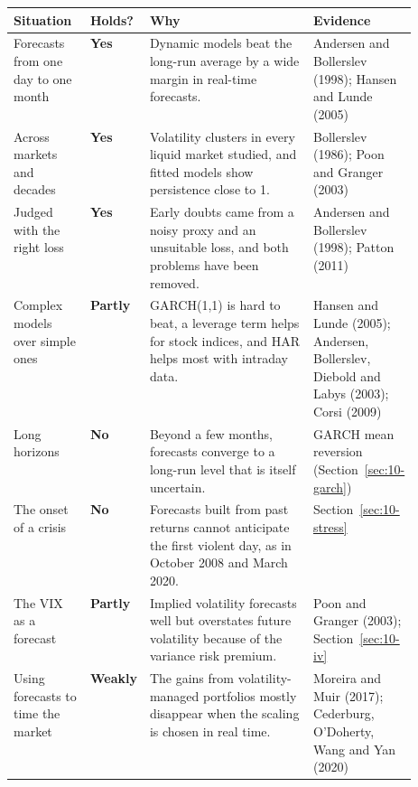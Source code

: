 \begin{center}
\small
\begin{tabularx}{\linewidth}{@{}>{\raggedright\arraybackslash}p{0.19\linewidth}>{\raggedright\arraybackslash}p{0.10\linewidth}>{\raggedright\arraybackslash}X>{\raggedright\arraybackslash}p{0.23\linewidth}@{}}
\toprule
Situation & Holds? & Why & Evidence \\
\midrule
Forecasts from one day to one month & \textbf{Yes} & Dynamic models beat the long-run average by a wide margin in real-time forecasts. & Andersen and Bollerslev (1998); Hansen and Lunde (2005) \\
\addlinespace[3pt]
Across markets and decades & \textbf{Yes} & Volatility clusters in every liquid market studied, and fitted models show persistence close to 1. & Bollerslev (1986); Poon and Granger (2003) \\
\addlinespace[3pt]
Judged with the right loss & \textbf{Yes} & Early doubts came from a noisy proxy and an unsuitable loss, and both problems have been removed. & Andersen and Bollerslev (1998); Patton (2011) \\
\addlinespace[3pt]
Complex models over simple ones & \textbf{Partly} & GARCH(1,1) is hard to beat, a leverage term helps for stock indices, and HAR helps most with intraday data. & Hansen and Lunde (2005); Andersen, Bollerslev, Diebold and Labys (2003); Corsi (2009) \\
\addlinespace[3pt]
Long horizons & \textbf{No} & Beyond a few months, forecasts converge to a long-run level that is itself uncertain. & GARCH mean reversion (Section~\ref{sec:10-garch}) \\
\addlinespace[3pt]
The onset of a crisis & \textbf{No} & Forecasts built from past returns cannot anticipate the first violent day, as in October 2008 and March 2020. & Section~\ref{sec:10-stress} \\
\addlinespace[3pt]
The VIX as a forecast & \textbf{Partly} & Implied volatility forecasts well but overstates future volatility because of the variance risk premium. & Poon and Granger (2003); Section~\ref{sec:10-iv} \\
\addlinespace[3pt]
Using forecasts to time the market & \textbf{Weakly} & The gains from volatility-managed portfolios mostly disappear when the scaling is chosen in real time. & Moreira and Muir (2017); Cederburg, O'Doherty, Wang and Yan (2020) \\
\bottomrule
\end{tabularx}
\end{center}


